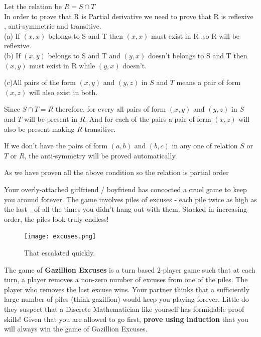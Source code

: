 \documentclass[addpoints]{exam}
\begin{document}
\begin{questions}
    \begin{solution}
    Let the relation be $R = S 
   \cap T$ \\
   In order to prove that R is Partial derivative we need to prove that R is reflexive , anti-symmetric and transitive.\\
   (a) If $(x,x)$ belongs to S and T then $(x,x)$ must exist in R ,so R will be reflexive.\\
   (b) If $(x,y)$ belongs to S and T and $(y,x)$ doesn't belongs to S and T then $(x,y)$ must exist in R while $(y,x)$ doesn't.
    
    (c)All pairs of the form $(x,y)$ and $(y,z)$ in $S$ and $T$ means a pair of form $(x,z)$ will also exist in both.
     
     Since $S \cap T = R$ therefore, for every all pairs of form  $(x,y)$ and $(y,z)$ in $S$ and $T$ will be present in $R$. And for each of the pairs a pair of form $(x,z)$ will also be present making $R$ transitive.
     
      If we don't have the pairs of form $(a, b)$ and $(b,c)$ in any one of relation $S$ or $T$ or $R$, the anti-symmetry will be proved automatically.
      
    As we have proven all the above condition so the relation is partial order 
   \end{solution}

\question Your overly-attached girlfriend / boyfriend has concocted a cruel game to keep you around forever. The game involves piles of excuses - each pile twice as high as the last - of all the times you didn't hang out with them. Stacked in increasing order, the piles look truly endless! 

\begin{figure}[ht]
  \centering
  \texttt{[image: excuses.png]}
  \caption{That escalated quickly.}
  \label{fig:Piles of excuses}
\end{figure}

The game of \textbf{Gazillion Excuses} is a turn based 2-player game such that at each turn, a player removes a non-zero number of excuses from one of the piles. The player who removes the last excuse wins. Your partner thinks that a sufficiently large number of piles (think gazillion) would keep you playing forever. Little do they suspect that a Discrete Mathematician like yourself has formidable proof skills! Given that you are allowed to go first, \textbf{prove using induction} that you will always win the game of Gazillion Excuses. 


\end{questions}
\end{document}
